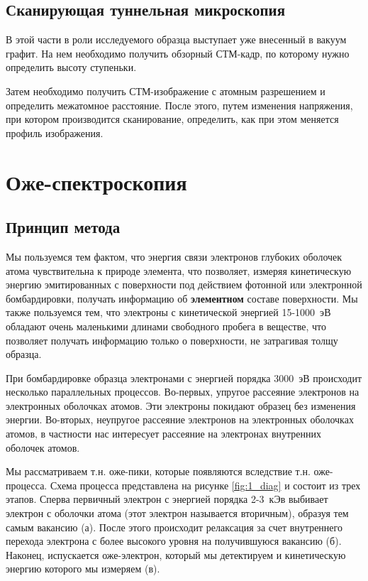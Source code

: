 \documentclass[a4paper, 12pt]{article}
\begin{document}
	\subsection{Сканирующая туннельная микроскопия}
	
	В этой части в роли исследуемого образца выступает уже внесенный в вакуум графит. На нем необходимо получить обзорный СТМ-кадр, по которому нужно определить высоту ступеньки. 
	
	Затем необходимо получить СТМ-изображение с атомным разрешением и определить межатомное расстояние. После этого, путем изменения напряжения, при котором производится сканирование, определить, как при этом меняется профиль изображения.
	
	
	\section{Оже-спектроскопия}
	
	\subsection{Принцип метода}
	
	Мы пользуемся тем фактом, что энергия связи электронов глубоких оболочек атома чувствительна к природе элемента, что позволяет, измеряя кинетическую энергию эмитированных с поверхности под действием фотонной или электронной бомбардировки, получать информацию об \textbf{элементном} составе поверхности. Мы также пользуемся тем, что электроны с кинетической энергией 15-1000~эВ обладают очень маленькими длинами свободного пробега в веществе, что позволяет получать информацию только о поверхности, не затрагивая толщу образца.
	
	При бомбардировке образца электронами с энергией порядка 3000~эВ происходит несколько параллельных процессов. Во-первых, упругое рассеяние электронов на электронных оболочках атомов. Эти электроны покидают образец без изменения энергии. Во-вторых, неупругое рассеяние электронов на электронных оболочках атомов, в частности нас интересует рассеяние на электронах внутренних оболочек атомов.
	
	Мы рассматриваем т.н. оже-пики, которые появляются вследствие т.н. оже-процесса. Схема процесса представлена на рисунке \ref{fig:1_diag} и состоит из трех этапов. Сперва первичный электрон с энергией порядка 2-3~кЭв выбивает электрон с оболочки атома (этот электрон называется вторичным), образуя тем самым вакансию (а). После этого происходит релаксация за счет внутреннего перехода электрона с более высокого уровня на получившуюся вакансию (б). Наконец, испускается оже-электрон, который мы детектируем и кинетическую энергию которого мы измеряем (в).
	
\end{document}
